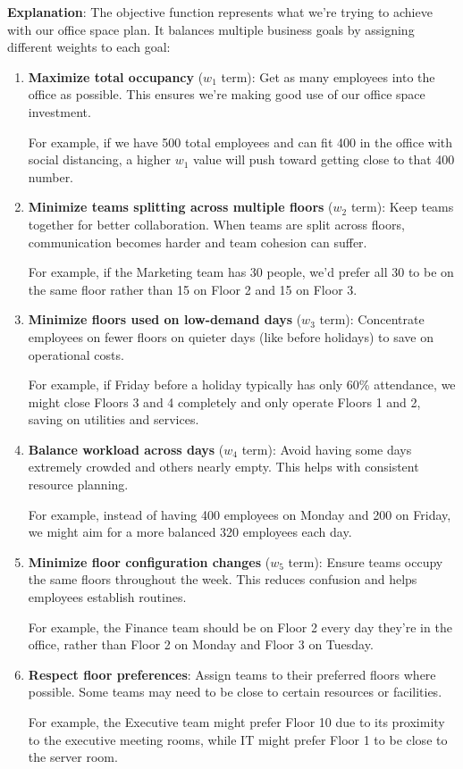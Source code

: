 \documentclass[12pt,a4paper]{article}
\begin{document}
\textbf{Explanation}: The objective function represents what we're trying to achieve with our office space plan. It balances multiple business goals by assigning different weights to each goal:

\begin{enumerate}
\item \textbf{Maximize total occupancy} ($w_1$ term): Get as many employees into the office as possible. This ensures we're making good use of our office space investment.

   For example, if we have 500 total employees and can fit 400 in the office with social distancing, a higher $w_1$ value will push toward getting close to that 400 number.

\item \textbf{Minimize teams splitting across multiple floors} ($w_2$ term): Keep teams together for better collaboration. When teams are split across floors, communication becomes harder and team cohesion can suffer.

   For example, if the Marketing team has 30 people, we'd prefer all 30 to be on the same floor rather than 15 on Floor 2 and 15 on Floor 3.

\item \textbf{Minimize floors used on low-demand days} ($w_3$ term): Concentrate employees on fewer floors on quieter days (like before holidays) to save on operational costs.

   For example, if Friday before a holiday typically has only 60\% attendance, we might close Floors 3 and 4 completely and only operate Floors 1 and 2, saving on utilities and services.

\item \textbf{Balance workload across days} ($w_4$ term): Avoid having some days extremely crowded and others nearly empty. This helps with consistent resource planning.

   For example, instead of having 400 employees on Monday and 200 on Friday, we might aim for a more balanced 320 employees each day.

\item \textbf{Minimize floor configuration changes} ($w_5$ term): Ensure teams occupy the same floors throughout the week. This reduces confusion and helps employees establish routines.

   For example, the Finance team should be on Floor 2 every day they're in the office, rather than Floor 2 on Monday and Floor 3 on Tuesday.

\item \textbf{Respect floor preferences}: Assign teams to their preferred floors where possible. Some teams may need to be close to certain resources or facilities.

   For example, the Executive team might prefer Floor 10 due to its proximity to the executive meeting rooms, while IT might prefer Floor 1 to be close to the server room.
\end{enumerate}
\end{document}
